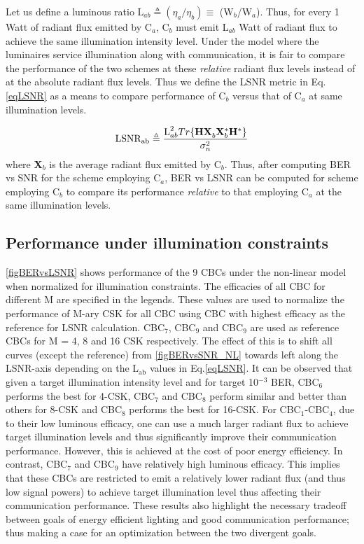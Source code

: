 \documentclass[10pt,letterpaper]{article}
\newcommand{\vm}[1]{{\bf{#1}}}
\begin{document}
Let us define a luminous ratio L$_{ab}\triangleq (\eta_a/\eta_b) \equiv$ (W$_b$/W$_a$). Thus, for every 1 Watt of radiant flux emitted by C$_a$, C$_b$ must emit L$_{ab}$ Watt of radiant flux to achieve the same illumination intensity level. Under the model where the luminaires service illumination along with communication, it is fair to compare the performance of the two schemes at these \textit{relative} radiant flux levels instead of at the absolute radiant flux levels. Thus we define the LSNR metric in Eq.\eqref{eqLSNR} as a means to compare performance of C$_b$ versus that of C$_a$ at same illumination levels. 

\begin{equation}
	\text{LSNR}_{\text{ab}} \triangleq \frac{\text{L}^{2}_{ab}Tr\{\vm{H}\vm{X}^{ }_{b}\vm{X}^{*}_{b}\vm{H}^{*}\}}{\sigma^{2}_{n}} 
	\label{eqLSNR}
\end{equation}
where \vm{X}$_{b}$ is the average radiant flux emitted by C$_b$. Thus, after computing BER vs SNR for the scheme employing C$_a$, BER vs LSNR can be computed for scheme employing C$_b$ to compare its performance \textit{relative} to that employing C$_a$ at the same illumination levels.

\subsection{Performance under illumination constraints}\label{ssCSKLSNR}

\figurename\ref{figBERvsLSNR} shows performance of the 9 CBCs under the non-linear model when normalized for illumination constraints. The efficacies of all CBC for different M are specified in the legends. These values are used to normalize the performance of M-ary CSK for all CBC using CBC with highest efficacy as the reference for LSNR calculation. {\color{red}CBC$_{7}$, CBC$_{9}$ and CBC$_{9}$ are used as reference CBCs for M = 4, 8 and 16 CSK respectively.} The effect of this is to shift all curves (except the reference) from \figurename\ref{figBERvsSNR_NL} towards left along the LSNR-axis depending on the L$_{\text{ab}}$ values in Eq.\eqref{eqLSNR}. It can be observed that given a target illumination intensity level and for target 10$^{-3}$ BER, CBC$_{6}$ performs the best for 4-CSK, CBC$_{7}$ and CBC$_{8}$ perform similar and better than others for 8-CSK and CBC$_{8}$ performs the best for 16-CSK. For CBC$_{1}$-CBC$_{4}$, due to their low luminous efficacy, one can use a much larger radiant flux to achieve target illumination levels and thus significantly improve their communication performance. However, this is achieved at the cost of poor energy efficiency. In contrast, CBC$_{7}$ and CBC$_{9}$ have relatively high luminous efficacy. This implies that these CBCs are restricted to emit a relatively lower radiant flux (and thus low signal powers) to achieve target illumination level thus affecting their communication performance. {\color{red}These results also highlight the necessary tradeoff between goals of energy efficient lighting and good communication performance; thus making a case for an optimization between the two divergent goals.}
\end{document}
